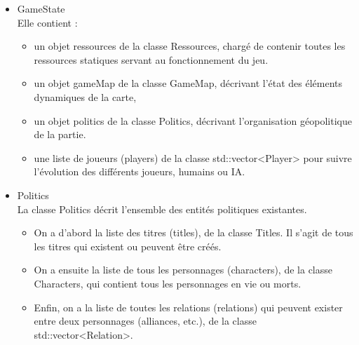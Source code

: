 \documentclass[a4paper,12pt]{article}
\begin{document}
\begin{itemize}
\item GameState\\
Elle contient :
\begin{itemize}
\item un objet ressources de la classe Ressources, chargé de contenir toutes les ressources statiques servant au fonctionnement du jeu. 
\item un objet gameMap de la classe GameMap, décrivant l'état des éléments dynamiques de la carte, 
\item un objet politics de la classe Politics, décrivant l'organisation géopolitique de la partie. 
\item une liste de joueurs (players) de la classe std::vector<Player> pour suivre l'évolution des différents joueurs, humains ou IA.\\
\end{itemize}

\item Politics\\
La classe Politics décrit l'ensemble des entités politiques existantes. 
\begin{itemize}
\item On a d'abord la liste des titres (titles), de la classe Titles. Il s'agit de tous les titres qui existent ou peuvent être créés. 
\item On a ensuite la liste de tous les personnages (characters), de la classe Characters, qui contient tous les personnages en vie ou morts. 
\item Enfin, on a la liste de toutes les relations (relations) qui peuvent exister entre deux personnages (alliances, etc.), de la classe std::vector<Relation>. \\
\end{itemize}


\end{itemize}
\end{document}

